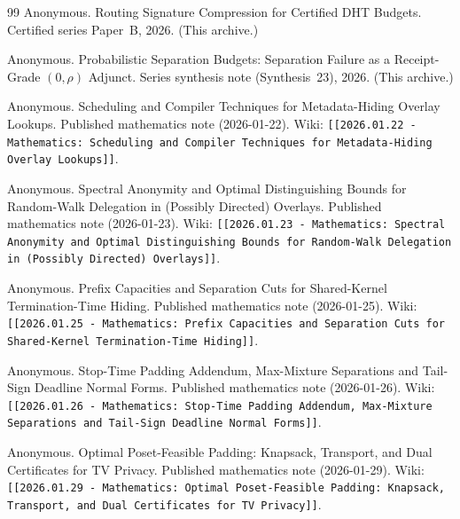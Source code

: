 \documentclass[11pt]{article}
\begin{document}
\begin{thebibliography}{99}
Anonymous.
\newblock Routing Signature Compression for Certified DHT Budgets.
\newblock Certified series Paper~B, 2026. (This archive.)

Anonymous.
\newblock Probabilistic Separation Budgets: Separation Failure as a Receipt-Grade $(0,\rho)$ Adjunct.
\newblock Series synthesis note (Synthesis~23), 2026. (This archive.)

Anonymous.
\newblock Scheduling and Compiler Techniques for Metadata-Hiding Overlay Lookups.
\newblock Published mathematics note (2026-01-22). Wiki: \texttt{[[2026.01.22 - Mathematics: Scheduling and Compiler Techniques for Metadata-Hiding Overlay Lookups]]}.

Anonymous.
\newblock Spectral Anonymity and Optimal Distinguishing Bounds for Random-Walk Delegation in (Possibly Directed) Overlays.
\newblock Published mathematics note (2026-01-23). Wiki: \texttt{[[2026.01.23 - Mathematics: Spectral Anonymity and Optimal Distinguishing Bounds for Random-Walk Delegation in (Possibly Directed) Overlays]]}.

Anonymous.
\newblock Prefix Capacities and Separation Cuts for Shared-Kernel Termination-Time Hiding.
\newblock Published mathematics note (2026-01-25). Wiki: \texttt{[[2026.01.25 - Mathematics: Prefix Capacities and Separation Cuts for Shared-Kernel Termination-Time Hiding]]}.

Anonymous.
\newblock Stop-Time Padding Addendum, Max-Mixture Separations and Tail-Sign Deadline Normal Forms.
\newblock Published mathematics note (2026-01-26). Wiki: \texttt{[[2026.01.26 - Mathematics: Stop-Time Padding Addendum, Max-Mixture Separations and Tail-Sign Deadline Normal Forms]]}.

Anonymous.
\newblock Optimal Poset-Feasible Padding: Knapsack, Transport, and Dual Certificates for TV Privacy.
\newblock Published mathematics note (2026-01-29). Wiki: \texttt{[[2026.01.29 - Mathematics: Optimal Poset-Feasible Padding: Knapsack, Transport, and Dual Certificates for TV Privacy]]}.

\end{thebibliography}
\end{document}

